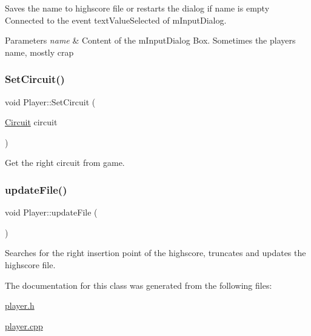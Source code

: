 Saves the name to highscore file or restarts the dialog if name is empty Connected to the event text\+Value\+Selected of m\+Input\+Dialog. 


\begin{DoxyParams}{Parameters}
{\em name} & Content of the m\+Input\+Dialog Box. Sometimes the player\textquotesingle{}s name, mostly crap \\
\hline
\end{DoxyParams}
\mbox{\label{class_player_a9ae683d200af27e5053abc0cd0d4e2de}} 
\subsubsection{\texorpdfstring{SetCircuit()}{SetCircuit()}}
{\footnotesize\ttfamily void Player\+::\+Set\+Circuit (\begin{DoxyParamCaption}\item[{\mbox{\hyperlink{player_8h_a9c0489b2664a5ac943d6f70b3a8dcd67}{Circuit}}}]{circuit }\end{DoxyParamCaption})}



Get the right circuit from game. 

\mbox{\label{class_player_a5393b97ffbc11743033b44a15e9eae04}} 
\subsubsection{\texorpdfstring{updateFile()}{updateFile()}}
{\footnotesize\ttfamily void Player\+::update\+File (\begin{DoxyParamCaption}{ }\end{DoxyParamCaption})}



Searches for the right insertion point of the highscore, truncates and updates the highscore file. 



The documentation for this class was generated from the following files\+:\begin{DoxyCompactItemize}
\item 
\mbox{\hyperlink{player_8h}{player.\+h}}\item 
\mbox{\hyperlink{player_8cpp}{player.\+cpp}}\end{DoxyCompactItemize}
